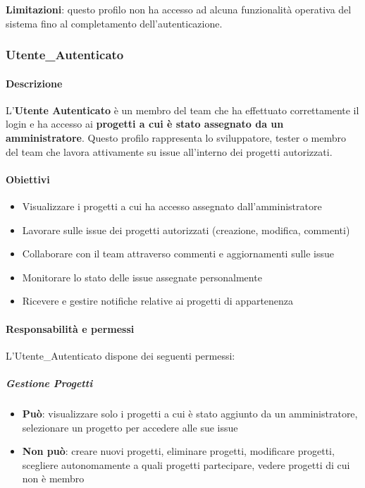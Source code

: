 \textbf{Limitazioni}: questo profilo non ha accesso ad alcuna funzionalità operativa del sistema fino al completamento dell'autenticazione.

\newpage

\subsubsection{Utente\_Autenticato}
\label{subsec:utente-autenticato}

\paragraph{Descrizione}

L'\textbf{Utente Autenticato} è un membro del team che ha effettuato correttamente il login e ha accesso ai \textbf{progetti a cui è stato assegnato da un amministratore}. Questo profilo rappresenta lo sviluppatore, tester o membro del team che lavora attivamente su issue all'interno dei progetti autorizzati.

\paragraph{Obiettivi}
\begin{itemize}[leftmargin=1.1em]
\item Visualizzare i progetti a cui ha accesso assegnato dall'amministratore
\item Lavorare sulle issue dei progetti autorizzati (creazione, modifica, commenti)
\item Collaborare con il team attraverso commenti e aggiornamenti sulle issue
\item Monitorare lo stato delle issue assegnate personalmente
\item Ricevere e gestire notifiche relative ai progetti di appartenenza
\end{itemize}

\paragraph{Responsabilità e permessi}
L'Utente\_Autenticato dispone dei seguenti permessi:

\subparagraph{Gestione Progetti}
\begin{itemize}[leftmargin=1.1em]
\item \textbf{Può}: visualizzare solo i progetti a cui è stato aggiunto da un amministratore, selezionare un progetto per accedere alle sue issue
\item \textbf{Non può}: creare nuovi progetti, eliminare progetti, modificare progetti, scegliere autonomamente a quali progetti partecipare, vedere progetti di cui non è membro
\end{itemize}

